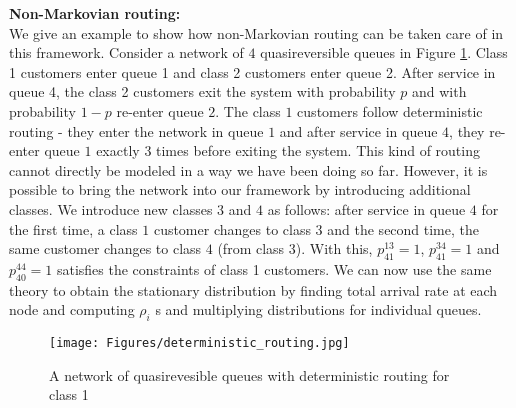 \documentclass[all-lectures.tex]{subfiles}
\begin{document}
\noindent \textbf{Non-Markovian routing: } \\
\indent We give an example to show how non-Markovian routing can be taken care of in this framework. Consider a network of $4$ quasireversible queues in Figure \ref{fig:det_routing}. Class 1 customers enter queue 1 and class 2 customers enter queue 2. After service in queue 4, the class 2 customers exit the system with probability $p$ and with probability $1-p$ re-enter queue $2$. The class $1$ customers follow deterministic routing - they enter the network in queue $1$ and after service in queue $4$, they re-enter queue $1$ exactly $3$ times before exiting the system. This kind of routing cannot directly be modeled in a way we have been doing so far. However, it is possible to bring the network into our framework by introducing additional classes. We introduce new classes $3$ and $4$ as follows: after service in queue $4$ for the first time, a class $1$ customer changes to class $3$ and the second time, the same customer changes to class $4$ (from class 3). With this, $p_{41}^{13} = 1$, $p_{41}^{34} = 1$ and $p_{40}^{44} = 1$ satisfies the constraints of class 1 customers. We can now use the same theory to obtain the stationary distribution by finding total arrival rate at each node and computing $\rho_i$ s and multiplying distributions for individual queues.  \\
\begin{figure}
\centering
\texttt{[image: Figures/deterministic\_routing.jpg]}
\caption{A network of quasirevesible queues with deterministic routing for class 1}
\label{fig:det_routing}
\end{figure}
\end{document}
